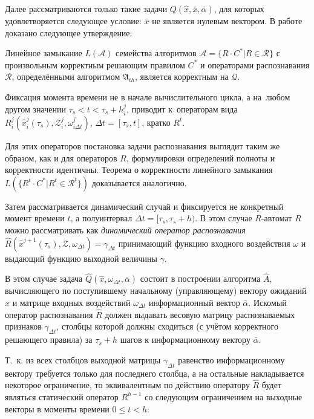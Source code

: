 Далее рассматриваются только такие задачи $Q(\hat{x},\bar{x},\bar{\alpha})$, для которых удовлетворяется следующее условие: $\bar x$ не является нулевым вектором. В работе доказано следующее утверждение:
\begin{Theorem}
	\label{th:correctness}
	Линейное замыкание $L(\mathcal A)$ семейства алгоритмов $\mathcal A=\{R\cdot C^*|R\in\mathcal R\}$ с произвольным корректным решающим правилом $C^*$ и операторами распознавания $\mathcal R$, определёнными алгоритмом $\mathfrak{A}_{th}$, является корректным на $\mathcal Q$.
\end{Theorem}

Фиксация момента времени не в начале вычислительного цикла, а на~любом другом значении $\tau_s<t<\tau_s+h_i^j$, приводит к~операторам вида $R_i^j(\hat x_i^j(\tau_s), \mathcal Z_i^j, \omega_{i\Delta t}^j)$, $\Delta t=[\tau_s, t]$,  кратко $R^t$.		

Для этих операторов постановка задачи распознавания выглядит таким же образом, как и для операторов $R$, формулировки определений полноты и корректности идентичны.
Теорема о корректности линейного замыкания $L(\{R^t\cdot{C^*}|R^t\in\mathcal R^t\})$ доказывается аналогично.		

Затем рассматривается динамический случай и фиксируется не конкретный момент времени $t$, а полуинтервал ${\Delta}t=[\tau_s,\tau_s+h)$. 	В этом случае $R$-автомат $R$ можно рассматривать как \textit{динамический оператор распознавания} $\hat R(\hat x^{j+1}(\tau_s), \mathcal Z, \omega_{\Delta t})=\gamma_{\Delta t}$ принимающий  функцию входного воздействия $\omega$ и  выдающий функцию выходной величины $\gamma$. 

В этом случае задача $\hat{Q}(\hat{x}, \omega_{{\Delta}t}, \bar{\alpha})$ состоит в построении алгоритма $\hat A$, вычисляющего по поступившему начальному (управляющему) вектору ожиданий $\hat{x}$ и матрице входных воздействий $\omega_{{\Delta}t}$  информационный вектор $\bar{\alpha}$. Искомый оператор распознавания $\hat{R}$ должен выдавать весовую матрицу распознаваемых признаков $\gamma_{\Delta{t}}$, столбцы которой должны сходиться (с учётом корректного решающего правила) за $\tau_s+h$ шагов к информационному вектору $\bar\alpha$.

Т.~к. из всех столбцов выходной матрицы $\gamma_{\Delta t}$ равенство информационному вектору требуется только для последнего столбца, а на остальные накладывается некоторое ограничение, то эквивалентным по действию оператору $\hat R$ будет являться статический оператор $R^{h-1}$ со следующим ограничением на выходные векторы в моменты времени $0\leqslant t<h$:

